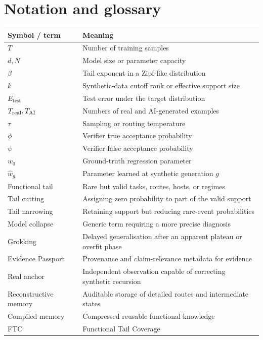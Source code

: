 \section{Notation and glossary}

\begin{longtable}{p{}p{}}
\toprule
\textbf{Symbol / term} & \textbf{Meaning} \\
\midrule
$T$ & Number of training samples \\
$d,N$ & Model size or parameter capacity \\
$\beta$ & Tail exponent in a Zipf-like distribution \\
$k$ & Synthetic-data cutoff rank or effective support size \\
$E_{\mathrm{test}}$ & Test error under the target distribution \\
$T_{\mathrm{real}},T_{\mathrm{AI}}$ & Numbers of real and AI-generated examples \\
$\tau$ & Sampling or routing temperature \\
$\phi$ & Verifier true acceptance probability \\
$\psi$ & Verifier false acceptance probability \\
$w_0$ & Ground-truth regression parameter \\
$\widehat w_g$ & Parameter learned at synthetic generation $g$ \\
Functional tail & Rare but valid tasks, routes, hosts, or regimes \\
Tail cutting & Assigning zero probability to part of the valid support \\
Tail narrowing & Retaining support but reducing rare-event probabilities \\
Model collapse & Generic term requiring a more precise diagnosis \\
Grokking & Delayed generalisation after an apparent plateau or overfit phase \\
Evidence Passport & Provenance and claim-relevance metadata for evidence \\
Real anchor & Independent observation capable of correcting synthetic recursion \\
Reconstructive memory & Auditable storage of detailed routes and intermediate states \\
Compiled memory & Compressed reusable functional knowledge \\
FTC & Functional Tail Coverage \\
\bottomrule
\end{longtable}
